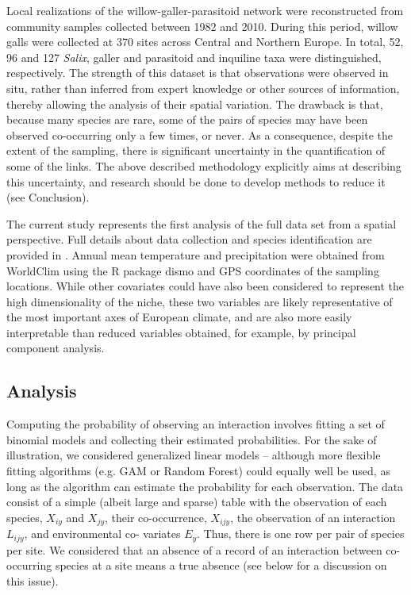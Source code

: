 \documentclass[12pt]{article}
\begin{document}
Local realizations of the willow-galler-parasitoid network were reconstructed
from community samples collected between 1982 and 2010. During this period,
willow galls were collected at 370 sites across Central and Northern Europe.
In total, 52, 96 and 127 \textit{Salix}, galler and parasitoid and inquiline
taxa were distinguished, respectively. The strength of this dataset is that
observations were observed in situ, rather than inferred from expert knowledge
or other sources of information, thereby allowing the analysis of their
spatial variation. The drawback is that, because many species are rare, some
of the pairs of species may have been observed co-occurring only a few times,
or never. As a consequence, despite the extent of the sampling, there is
significant uncertainty in the quantification of some of the links. The above
described methodology explicitly aims at describing this uncertainty, and
research should be done to develop methods to reduce it (see Conclusion).

The current study represents the first analysis of the full data set
from a spatial perspective. Full details about data collection and species
identification are provided in \citep{Kopelke2017}. Annual mean temperature
and precipitation were obtained from WorldClim using the R package dismo
\citep{Hijmans2015} and GPS coordinates of the sampling locations. While other
covariates could have also been considered to represent the high
dimensionality of the niche, these two variables are likely representative of
the most important axes of European climate, and are also more easily
interpretable than reduced variables obtained, for example, by principal
component analysis.

\subsection*{Analysis}

Computing the probability of observing an interaction involves fitting a set
of binomial models and collecting their estimated probabilities. For the sake
of illustration, we considered generalized linear models – although more
flexible fitting algorithms (e.g. GAM or Random Forest) could equally well be
used, as long as the algorithm can estimate the probability for each
observation. The data consist of a simple (albeit large and sparse) table with
the observation of each species, $X_{iy}$ and $X_{jy}$, their co-occurrence,
$X_{ijy}$, the observation of an interaction $L_{ijy}$, and environmental co-
variates $E_y$. Thus, there is one row per pair of species per site. We
considered that an absence of a record of an interaction between co-occurring
species at a site means a true absence (see below for a discussion on this
issue).
\end{document}
